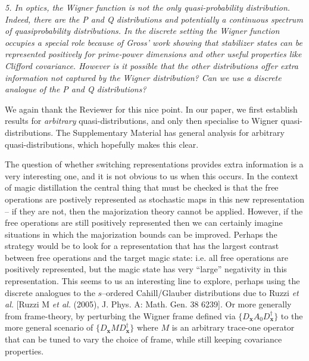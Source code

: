 \documentclass[11pt]{letter}
\def\x{\boldsymbol{x}}
\begin{document}
\textit{5. In optics, the Wigner function is not the only quasi-probability distribution. Indeed, there are the P and Q distributions and potentially a continuous spectrum of quasiprobability distributions. In the discrete setting the Wigner function occupies a special role because of Gross' work showing that stabilizer states can be represented positively for prime-power dimensions and other useful properties like Clifford covariance. However is it possible that the other distributions offer extra information not captured by the Wigner distribution? Can we use a discrete analogue of the P and Q distributions?}

We again thank the Reviewer for this nice point. In our paper, we first establish results for \emph{arbitrary} quasi-distributions,  and only then specialise to Wigner quasi-distributions. The Supplementary Material has general analysis for arbitrary quasi-distributions, which hopefully makes this clear.

The question of whether switching representations provides extra information is a very interesting one,  and it is not obvious to us when this occurs.  In the context of magic distillation the central thing that must be checked is that the free operations are postively represented as stochastic maps in this new representation -- if they are not,  then the majorization theory cannot be applied.  However, if the free operations are still positively represented then we can certainly imagine situations in which the majorization bounds can be improved.  Perhaps the strategy would be to look for a representation that has the largest contrast between free operations and the target magic state: i.e.  all free operations are positively represented,  but the magic state has very ``large'' negativity in this representation.  This seems to us an interesting line to explore,  perhaps using the discrete analogues to the $s$--ordered Cahill/Glauber distributions due to Ruzzi \textit{et al.} [Ruzzi M \textit{et al.} (2005),  J. Phys. A: Math. Gen. 38 6239].  Or more generally from frame-theory, by perturbing the Wigner frame defined via $\{D_{\x}A_0 D_{\x}^\dagger\}$ to the more general scenario of $\{D_{\x} M D_{\x}^\dagger\}$ where $M$ is an arbitrary trace-one operator that can be tuned to vary the choice of frame,  while still keeping covariance properties.
\end{document}
